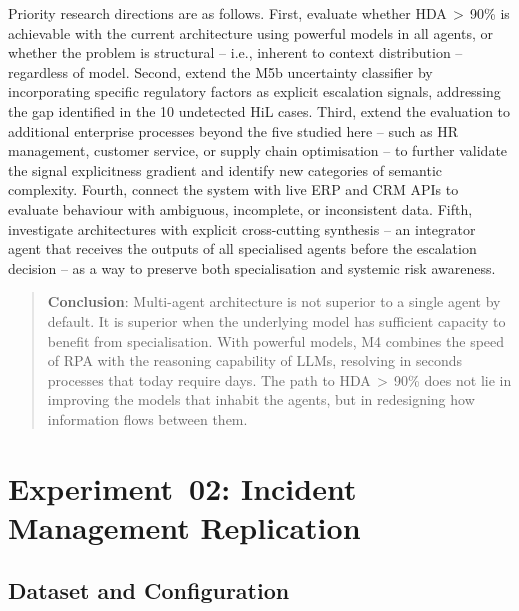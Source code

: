 \documentclass[preprint,12pt,authoryear]{elsarticle}
\begin{document}
Priority research directions are as follows.
First, evaluate whether HDA\,$>$\,90\% is achievable with the current
architecture using powerful models in all agents, or whether the problem is
structural -- i.e., inherent to context distribution -- regardless of model.
Second, extend the M5b uncertainty classifier by incorporating specific
regulatory factors as explicit escalation signals, addressing the gap identified
in the 10 undetected HiL cases.
Third, extend the evaluation to additional enterprise processes beyond the
five studied here -- such as HR management, customer service, or supply chain
optimisation -- to further validate the signal explicitness gradient and
identify new categories of semantic complexity.
Fourth, connect the system with live ERP and CRM APIs to evaluate behaviour
with ambiguous, incomplete, or inconsistent data.
Fifth, investigate architectures with explicit cross-cutting synthesis -- an
integrator agent that receives the outputs of all specialised agents before the
escalation decision -- as a way to preserve both specialisation and systemic
risk awareness.

\begin{quote}
\textbf{Conclusion}: Multi-agent architecture is not superior to a single agent
by default.
It is superior when the underlying model has sufficient capacity to benefit from
specialisation.
With powerful models, M4 combines the speed of RPA with the reasoning capability
of LLMs, resolving in seconds processes that today require days.
The path to HDA\,$>$\,90\% does not lie in improving the models that inhabit the
agents, but in redesigning how information flows between them.
\end{quote}


\section{Experiment~02: Incident Management Replication}
\label{sec:incident}

\subsection{Dataset and Configuration}
\end{document}
